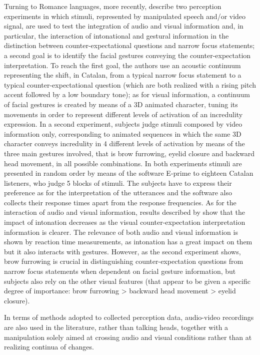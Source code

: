 \documentclass[output=paper]{langsci/langscibook}
\begin{document}
Turning to Romance languages, more recently, \citet{BorrasComes2011} describe two perception experiments in which stimuli, represented by manipulated speech and\slash or video signal, are used to test the integration of audio and visual information and, in particular, the interaction of intonational and gestural information in the distinction between counter-expectational questions and narrow focus statements; a second goal is to identify the facial gestures conveying the counter-expectation interpretation. To reach the first goal, the authors use an acoustic continuum representing the shift, in Catalan, from a typical narrow focus statement to a typical  counter-expectational question (which are both realized with a rising pitch accent followed by a low boundary tone); as for visual information, a continuum of facial gestures is created by means of a 3D animated character, tuning its movements in order to represent different levels of activation of an incredulity expression. In a second experiment, subjects judge stimuli composed by video information only, corresponding to animated sequences in which the same 3D character conveys incredulity in 4 different levels of activation by means of the three main gestures involved, that is brow furrowing, eyelid closure and backward head movement, in all possible combinations. In both experiments stimuli are presented in random order by means of the software E-prime to eighteen Catalan listeners, who judge 5 blocks of stimuli. The subjects have to express their preference as for the interpretation of the utterances and the software also collects their response times apart from the response frequencies. As for the interaction of audio and visual information, results described by \citet{BorrasComes2011} show that the impact of intonation decreases as the visual counter-expectation interpretation information is clearer. The relevance of both audio and visual information is shown by reaction time measurements, as intonation has a great impact on them but it also interacts with gestures. However, as the second experiment shows, brow furrowing is crucial in distinguishing counter-expectation questions from narrow focus statements when dependent on facial gesture information, but subjects also rely on the other visual features (that appear to be given a specific degree of importance: brow furrowing > backward head movement > eyelid closure). 

In terms of methods adopted to collected perception data, audio-video recordings are also used in the literature, rather than talking heads, together with a manipulation solely aimed at crossing audio and visual conditions rather than at realizing continua of changes.
\end{document}
